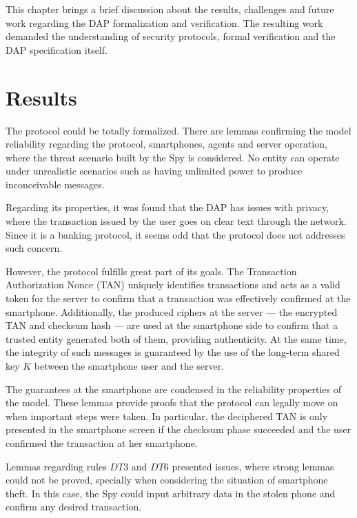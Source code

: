 \label{chap:conclusion}
This chapter brings a brief discussion about the results, challenges and future work regarding the DAP formalization and verification. The resulting work demanded the understanding of security protocols, formal verification and the DAP specification itself.


\section{Results}
The protocol could be totally formalized. There are lemmas confirming the model reliability regarding the protocol, smartphones, agents and server operation, where the threat scenario built by the Spy is considered. No entity can operate under unrealistic scenarios such as having unlimited power to produce inconceivable messages.

Regarding its properties, it was found that the DAP has issues with privacy, where the transaction issued by the user goes on clear text through the network. Since it is a banking protocol, it seems odd that the protocol does not addresses such concern.

However, the protocol fulfills great part of its goals. The Transaction Authorization Nonce (TAN) uniquely identifies transactions and acts as a valid token for the server to confirm that a transaction was effectively confirmed at the smartphone. Additionally, the produced ciphers at the server --- the encrypted TAN and checksum hash --- are used at the smartphone side to confirm that a trusted entity generated both of them, providing authenticity. At the same time, the integrity of such messages is guaranteed by the use of the long-term shared key \(K\) between the smartphone user and the server.

The guarantees at the smartphone are condensed in the reliability properties of the model. These lemmas provide proofs that the protocol can legally move on when important steps were taken. In particular, the deciphered TAN is only presented in the smartphone screen if the checksum phase succeeded and the user confirmed the transaction at her smartphone.

Lemmas regarding rules $DT3$ and $DT6$ presented issues, where strong lemmas could not be proved, specially when considering the situation of smartphone theft. In this case, the Spy could input arbitrary data in the stolen phone and confirm any desired transaction.


